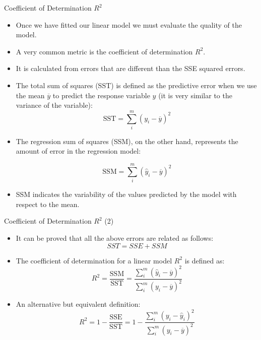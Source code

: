 \documentclass[handout]{beamer}
\begin{document}
\begin{frame}{Coefficient of Determination $R^2$}
\scriptsize{
\begin{itemize}
 \item  Once we have fitted our linear model we must evaluate the quality of the model.
 \item A very common metric is the coefficient of determination $R^2$. 
 \item  It is calculated from errors that are different than the SSE squared errors.
 \item The total sum of squares (SST)  is defined as the predictive error when we use the mean $\overline{y}$  to predict the response variable $y$ (it is very similar to the variance of the variable):
 \begin{displaymath}
  \text{SST} = \sum_{i}^{m}(y_i-\overline{y})^2  
 \end{displaymath}
 \item  The regression sum of squares (SSM), on the other hand, represents the amount of error in the regression model: 

 \begin{displaymath}
  \text{SSM} = \sum_{i}^{m}(\hat{y}_i-\overline{y})^2 
 \end{displaymath}
  
 \item  SSM indicates the variability of the values predicted by the model with respect to the mean. 
 
  
\end{itemize}

}
\end{frame}

\begin{frame}{Coefficient of Determination $R^2$ (2)}
\scriptsize{
\begin{itemize}
 \item It can be proved that all the above errors are related as follows: \begin{equation}
 SST = SSE + SSM                                                 
    \end{equation}


 \item The coefficient of determination for a linear model $R^2$ is defined as:
 \begin{equation}
  R^2= \frac{\text{SSM}}{\text{SST}} = \frac{\sum_{i}^{m}(\hat{y}_i-\overline{y})^2 }{\sum_{i}^{m}(y_i-\overline{y})^2  }
 \end{equation}
 
 \item An alternative but equivalent definition:
  \begin{equation}
  R^2= 1-\frac{\text{SSE}}{\text{SST}} = 1- \frac{\sum_{i}^{m}(y_i-\hat{y}_i)^2 }{\sum_{i}^{m}(y_i-\overline{y})^2  }
  \label{eq:r2}
 \end{equation}
 

  
\end{itemize}


}
\end{frame}
\end{document}
